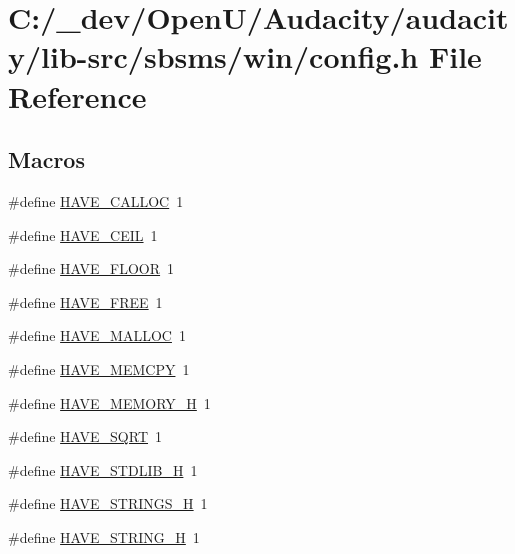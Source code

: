 \hypertarget{lib-src_2sbsms_2win_2config_8h}{}\section{C\+:/\+\_\+dev/\+Open\+U/\+Audacity/audacity/lib-\/src/sbsms/win/config.h File Reference}
\label{lib-src_2sbsms_2win_2config_8h}
\subsection*{Macros}
\begin{DoxyCompactItemize}
\item 
\#define \hyperlink{lib-src_2sbsms_2win_2config_8h_a631f7011e0e3afd6f6732e18ea7be4ac}{H\+A\+V\+E\+\_\+\+C\+A\+L\+L\+OC}~1
\item 
\#define \hyperlink{lib-src_2sbsms_2win_2config_8h_afb1ce161af1df3c2c55a629ea0d4bb6c}{H\+A\+V\+E\+\_\+\+C\+E\+IL}~1
\item 
\#define \hyperlink{lib-src_2sbsms_2win_2config_8h_ab452be2c7cc8652644e7782380300b8b}{H\+A\+V\+E\+\_\+\+F\+L\+O\+OR}~1
\item 
\#define \hyperlink{lib-src_2sbsms_2win_2config_8h_a7ff023a4e451532aa34a6dace7f6255e}{H\+A\+V\+E\+\_\+\+F\+R\+EE}~1
\item 
\#define \hyperlink{lib-src_2sbsms_2win_2config_8h_a14503280ca0cb757db915eea09282bfc}{H\+A\+V\+E\+\_\+\+M\+A\+L\+L\+OC}~1
\item 
\#define \hyperlink{lib-src_2sbsms_2win_2config_8h_ab9262e27fbdd200f4ddc0fd06ac037c0}{H\+A\+V\+E\+\_\+\+M\+E\+M\+C\+PY}~1
\item 
\#define \hyperlink{lib-src_2sbsms_2win_2config_8h_ae93a78f9d076138897af441c9f86f285}{H\+A\+V\+E\+\_\+\+M\+E\+M\+O\+R\+Y\+\_\+H}~1
\item 
\#define \hyperlink{lib-src_2sbsms_2win_2config_8h_a04f983617a16d562f9a6df2e34a6a41c}{H\+A\+V\+E\+\_\+\+S\+Q\+RT}~1
\item 
\#define \hyperlink{lib-src_2sbsms_2win_2config_8h_a9e0e434ec1a6ddbd97db12b5a32905e0}{H\+A\+V\+E\+\_\+\+S\+T\+D\+L\+I\+B\+\_\+H}~1
\item 
\#define \hyperlink{lib-src_2sbsms_2win_2config_8h_a405d10d46190bcb0320524c54eafc850}{H\+A\+V\+E\+\_\+\+S\+T\+R\+I\+N\+G\+S\+\_\+H}~1
\item 
\#define \hyperlink{lib-src_2sbsms_2win_2config_8h_ad4c234dd1625255dc626a15886306e7d}{H\+A\+V\+E\+\_\+\+S\+T\+R\+I\+N\+G\+\_\+H}~1

\end{DoxyCompactItemize}
